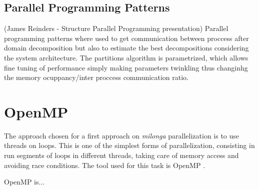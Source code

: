 \documentclass{anstrans}
\renewcommand{\vec}[1]{\bm{#1}} %
\newcommand{\vd}{\bm{\cdot}} %
\newcommand{\grad}{\vec{\nabla}} %
\newcommand{\ud}{\mathop{}\!\mathrm{d}} %
\begin{document}
\subsection{Parallel Programming Patterns}
(James Reinders - Structure Parallel Programming presentation)
Parallel programming patterns where used to get communication between proccess after
domain decomposition but also to estimate the best decompositions considering the system
architecture. The partitions algorithm is parametrized, which allows fine tuning of performance
simply making parameters twinkling thus changinhg the memory ocuppancy/inter proccess communication ratio.




\section{OpenMP}

The approach chosen for a first approach on \textit{milonga} parallelization
is to use threads on loops. This is one of the simplest forms of parallelization,
consisting in run segments of loops in different threads, taking care of memory
access and avoiding race conditions. The tool used for this task is OpenMP
\cite{Dagum1998}.

OpenMP is...



\end{document}

